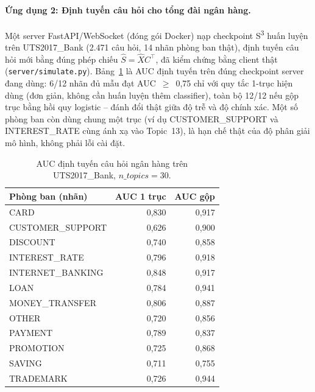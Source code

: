 \documentclass[11pt]{article}
\begin{document}
\paragraph{Ứng dụng 2: Định tuyến câu hỏi cho tổng đài ngân hàng.} Một
server FastAPI/WebSocket (đóng gói Docker) nạp checkpoint
S\textsuperscript{3} huấn luyện trên UTS2017\_Bank (2.471 câu hỏi, 14
nhãn phòng ban thật), định tuyến câu hỏi mới bằng đúng phép chiếu
$\hat{S}=\hat{X}C^{\top}$, đã kiểm chứng bằng client thật
(\texttt{server/simulate.py}). Bảng~\ref{tab:bank-routing} là AUC định
tuyến trên đúng checkpoint server đang dùng: 6/12 nhãn đủ mẫu đạt
AUC~$\geq$~0,75 chỉ với quy tắc 1-trục hiện dùng (đơn giản, không cần
huấn luyện thêm classifier), toàn bộ 12/12 nếu gộp trục bằng hồi quy
logistic -- đánh đổi thật giữa độ trễ và độ chính xác. Một số phòng ban
còn dùng chung một trục (ví dụ CUSTOMER\_SUPPORT và INTEREST\_RATE cùng
ánh xạ vào Topic~13), là hạn chế thật của độ phân giải mô hình, không
phải lỗi cài đặt.

\begin{table}[t]
    \centering
    \small
    \begin{tabular}{@{}l r r@{}}
        \toprule
        \textbf{Phòng ban (nhãn)} & \textbf{AUC 1 trục} & \textbf{AUC gộp} \\
        \midrule
        CARD             & 0,830 & 0,917 \\
        CUSTOMER\_SUPPORT & 0,626 & 0,900 \\
        DISCOUNT         & 0,740 & 0,858 \\
        INTEREST\_RATE    & 0,796 & 0,918 \\
        INTERNET\_BANKING & 0,848 & 0,917 \\
        LOAN             & 0,784 & 0,941 \\
        MONEY\_TRANSFER   & 0,806 & 0,887 \\
        OTHER            & 0,720 & 0,856 \\
        PAYMENT          & 0,789 & 0,837 \\
        PROMOTION        & 0,725 & 0,868 \\
        SAVING           & 0,711 & 0,755 \\
        TRADEMARK        & 0,726 & 0,944 \\
        \bottomrule
    \end{tabular}
    \caption{AUC định tuyến câu hỏi ngân hàng trên UTS2017\_Bank,
    $n\_topics=30$.}
    \label{tab:bank-routing}
\end{table}
\end{document}
